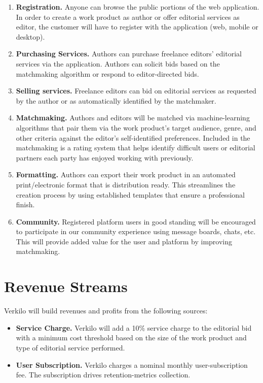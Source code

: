 \documentclass[10pt,openany]{book}
\providecommand{\tightlist}{%
  \setlength{\itemsep}{0pt}\setlength{\parskip}{0pt}}
\begin{document}
\begin{enumerate}
\def\labelenumi{\arabic{enumi}.}
\tightlist
\item
  \textbf{Registration.} Anyone can browse the public portions of the
  web application. In order to create a work product as author or offer
  editorial services as editor, the customer will have to register with
  the application (web, mobile or desktop).
\item
  \textbf{Purchasing Services.} Authors can purchase freelance editors'
  editorial services via the application. Authors can solicit bids based
  on the matchmaking algorithm or respond to editor-directed bids.
\item
  \textbf{Selling services.} Freelance editors can bid on editorial
  services as requested by the author or as automatically identified by
  the matchmaker.
\item
  \textbf{Matchmaking.} Authors and editors will be matched via
  machine-learning algorithms that pair them via the work product's
  target audience, genre, and other criteria against the editor's
  self-identified preferences. Included in the matchmaking is a rating
  system that helps identify difficult users or editorial partners each
  party has enjoyed working with previously.
\item
  \textbf{Formatting.} Authors can export their work product in an
  automated print/electronic format that is distribution ready. This
  streamlines the creation process by using established templates that
  ensure a professional finish.
\item
  \textbf{Community.} Registered platform users in good standing will be
  encouraged to participate in our community experience using message
  boards, chats, etc. This will provide added value for the user and
  platform by improving matchmaking.
\end{enumerate}

\hypertarget{revenue-streams}{%
\section{Revenue Streams}\label{revenue-streams}}

Verkilo will build revenues and profits from the following sources:

\begin{itemize}
\tightlist
\item
  \textbf{Service Charge.} Verkilo will add a 10\% service charge to the
  editorial bid with a minimum cost threshold based on the size of the
  work product and type of editorial service performed.
\item
  \textbf{User Subscription.} Verkilo charges a nominal monthly
  user-subscription fee. The subscription drives retention-metrics
  collection.
\end{itemize}
\end{document}
